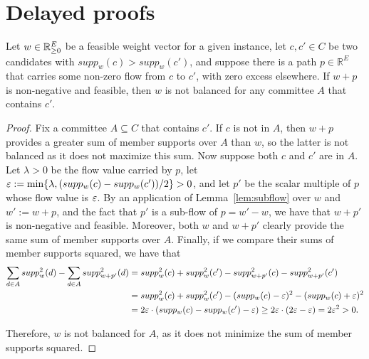 
\section{Delayed proofs}\label{s:proofs}

\begin{lemma}\label{lem:path}
Let $w\in \mathbb{R}_{\geq 0}^E$ be a feasible weight vector for a given instance, let $c,c'\in C$ be two candidates with $supp_w(c)>supp_w(c')$, and suppose there is a path $p\in\mathbb{R}^E$ that carries some non-zero flow from $c$ to $c'$, with zero excess elsewhere. If $w+p$ is non-negative and feasible, then $w$ is not balanced for any committee $A$ that contains $c'$.
\end{lemma}

\begin{proof}
Fix a committee $A\subseteq C$ that contains $c'$. If $c$ is not in $A$, then $w+p$ provides a greater sum of member supports over $A$ than $w$, so the latter is not balanced as it does not maximize this sum. Now suppose both $c$ and $c'$ are in $A$. Let $\lambda>0$ be the flow value carried by $p$, let $\varepsilon:=\min\{\lambda, (supp_w(c) - supp_w(c'))/2\}>0$, and let $p'$ be the scalar multiple of $p$ whose flow value is $\varepsilon$. By an application of Lemma~\ref{lem:subflow} over $w$ and $w':=w+p$, and the fact that $p'$ is a sub-flow of $p=w'-w$, we have that $w+p'$ is non-negative and feasible. Moreover, both $w$ and $w+p'$ clearly provide the same sum of member supports over $A$. Finally, if we compare their sums of member supports squared, we have that
\begin{align*}
\sum_{d\in A} supp_w^2(d)-\sum_{d\in A} supp^2_{w+p'}(d) &=supp_w^2(c) +supp_w^2(c')-supp^2_{w+p'}(c) -supp^2_{w+p'}(c')\\
&= supp_w^2(c) +supp_w^2(c') - (supp_w(c) - \varepsilon)^2 - (supp_w(c) + \varepsilon)^2 \\
&= 2\varepsilon\cdot (supp_w(c) - supp_w(c') - \varepsilon) \geq 2\varepsilon\cdot(2\varepsilon - \varepsilon)=2\varepsilon^2>0.
\end{align*}

Therefore, $w$ is not balanced for $A$, as it does not minimize the sum of member supports squared.  
\end{proof}

